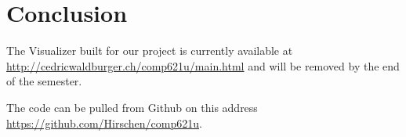 \documentclass[11pt,a4paper,english]{article}
\begin{document}
\begin{itemize}
						
%						
%						
						
					
						
				\end{itemize}
 \newpage	
	\section{Conclusion}
		The Visualizer built for our project is currently available at \url{http://cedricwaldburger.ch/comp621u/main.html} and will be removed by the end of the semester. 

		The code can be pulled from Github on this address \url{https://github.com/Hirschen/comp621u}.
\end{document}
